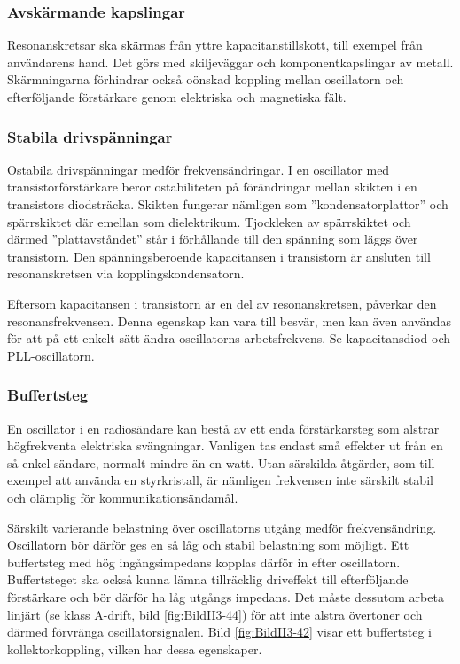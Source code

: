 \subsubsection{Avskärmande kapslingar}

Resonanskretsar ska skärmas från yttre kapacitanstillskott, till exempel från 
användarens hand.
Det görs med skiljeväggar och komponentkapslingar av metall.
Skärmningarna förhindrar också oönskad koppling mellan oscillatorn och
efterföljande förstärkare genom elektriska och magnetiska fält.

\subsubsection{Stabila drivspänningar}

Ostabila drivspänningar medför frekvensändringar.
I en oscillator med transistorförstärkare beror ostabiliteten på förändringar
mellan skikten i en transistors diodsträcka.
Skikten fungerar nämligen som ''kondensatorplattor'' och spärrskiktet där
emellan som dielektrikum.
Tjockleken av spärrskiktet och därmed ''plattavståndet'' står i förhållande
till den spänning som läggs över transistorn.
Den spänningsberoende kapacitansen i transistorn är ansluten till
resonanskretsen via kopplingskondensatorn.

Eftersom kapacitansen i transistorn är en del av resonanskretsen, påverkar
den resonansfrekvensen.
Denna egenskap kan vara till besvär, men kan även användas för att på ett
enkelt sätt ändra oscillatorns arbetsfrekvens.
Se kapacitansdiod och PLL-oscillatorn.

\subsubsection{Buffertsteg}
\label{buffertsteg}

En oscillator i en radiosändare kan bestå av ett enda förstärkarsteg
som alstrar högfrekventa elektriska svängningar.
Vanligen tas endast små effekter ut från en så enkel sändare, normalt mindre än
en watt.
Utan särskilda åtgärder, som till exempel att använda en styrkristall, är nämligen
frekvensen inte särskilt stabil och olämplig för kommunikationsändamål.

Särskilt varierande belastning över oscillatorns utgång medför frekvensändring.
Oscillatorn bör därför ges en så låg och stabil belastning som möjligt.
Ett buffertsteg med hög ingångsimpedans kopplas därför in efter oscillatorn.
Buffertsteget ska också kunna lämna tillräcklig driveffekt till efterföljande 
förstärkare och bör därför ha låg utgångs impedans.
Det måste dessutom arbeta linjärt (se klass A-drift, bild \ref{fig:BildII3-44})
för att inte alstra övertoner och därmed förvränga oscillatorsignalen.
Bild \ref{fig:BildII3-42} visar ett buffertsteg i kollektorkoppling, vilken har
dessa egenskaper.

